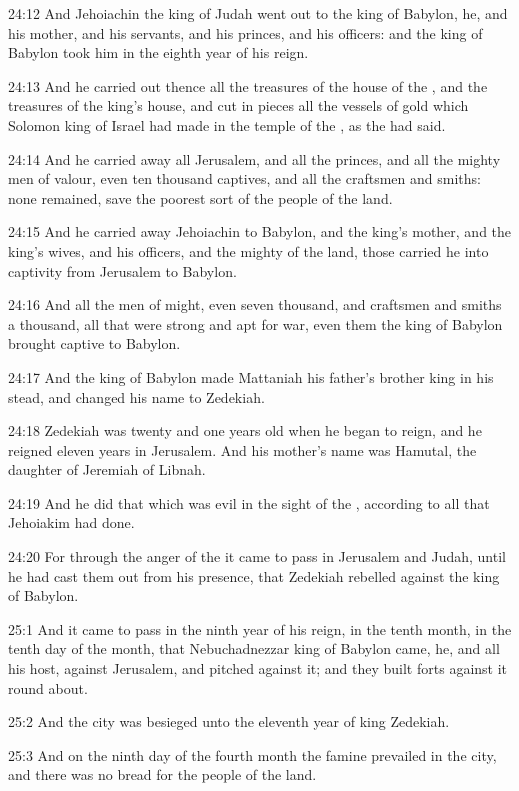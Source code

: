 24:12 And Jehoiachin the king of Judah went out to the king of Babylon, he, and his mother, and his servants, and his princes, and his officers: and the king of Babylon took him in the eighth year of his reign.

24:13 And he carried out thence all the treasures of the house of the \LORD, and the treasures of the king's house, and cut in pieces all the vessels of gold which Solomon king of Israel had made in the temple of the \LORD, as the \LORD had said.

24:14 And he carried away all Jerusalem, and all the princes, and all the mighty men of valour, even ten thousand captives, and all the craftsmen and smiths: none remained, save the poorest sort of the people of the land.

24:15 And he carried away Jehoiachin to Babylon, and the king's mother, and the king's wives, and his officers, and the mighty of the land, those carried he into captivity from Jerusalem to Babylon.

24:16 And all the men of might, even seven thousand, and craftsmen and smiths a thousand, all that were strong and apt for war, even them the king of Babylon brought captive to Babylon.

24:17 And the king of Babylon made Mattaniah his father's brother king in his stead, and changed his name to Zedekiah.

24:18 Zedekiah was twenty and one years old when he began to reign, and he reigned eleven years in Jerusalem. And his mother's name was Hamutal, the daughter of Jeremiah of Libnah.

24:19 And he did that which was evil in the sight of the \LORD, according to all that Jehoiakim had done.

24:20 For through the anger of the \LORD it came to pass in Jerusalem and Judah, until he had cast them out from his presence, that Zedekiah rebelled against the king of Babylon.

25:1 And it came to pass in the ninth year of his reign, in the tenth month, in the tenth day of the month, that Nebuchadnezzar king of Babylon came, he, and all his host, against Jerusalem, and pitched against it; and they built forts against it round about.

25:2 And the city was besieged unto the eleventh year of king Zedekiah.

25:3 And on the ninth day of the fourth month the famine prevailed in the city, and there was no bread for the people of the land.

